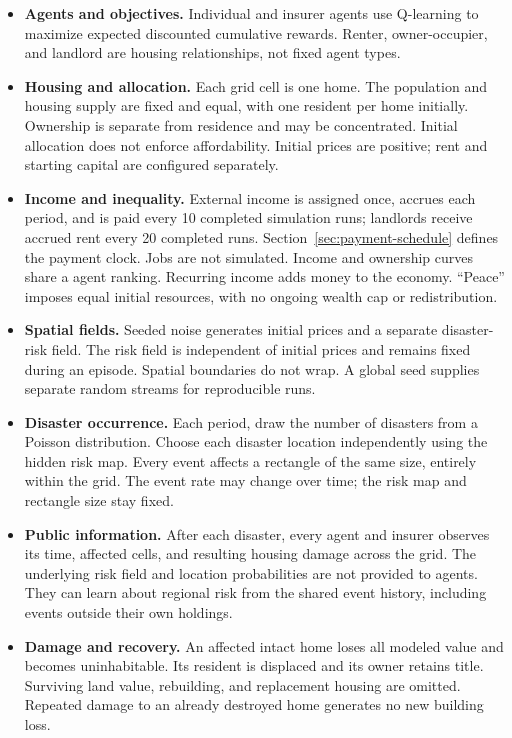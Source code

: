 \documentclass[10pt]{article}
\makeatletter
\renewcommand\section{\@startsection{section}{1}{\z@}{-1.6ex plus -.4ex}{.7ex}{\normalfont\large\bfseries}}
\makeatother
\begin{document}
\section{Model assumptions}
\label{sec:assumptions}

\begin{itemize}
\item \textbf{Agents and objectives.} Individual and insurer agents use Q-learning to maximize expected discounted cumulative rewards. Renter, owner-occupier, and landlord are housing relationships, not fixed agent types.
\item \textbf{Housing and allocation.} Each grid cell is one home. The population and housing supply are fixed and equal, with one resident per home initially. Ownership is separate from residence and may be concentrated. Initial allocation does not enforce affordability. Initial prices are positive; rent and starting capital are configured separately.
\item \textbf{Income and inequality.} External income is assigned once, accrues each period, and is paid every 10 completed simulation runs; landlords receive accrued rent every 20 completed runs. Section~\ref{sec:payment-schedule} defines the payment clock. Jobs are not simulated. Income and ownership curves share a agent ranking. Recurring income adds money to the economy. ``Peace'' imposes equal initial resources, with no ongoing wealth cap or redistribution.
\item \textbf{Spatial fields.} Seeded noise generates initial prices and a separate disaster-risk field. The risk field is independent of initial prices and remains fixed during an episode. Spatial boundaries do not wrap. A global seed supplies separate random streams for reproducible runs.
\item \textbf{Disaster occurrence.} Each period, draw the number of disasters from a Poisson distribution. Choose each disaster location independently using the hidden risk map. Every event affects a rectangle of the same size, entirely within the grid. The event rate may change over time; the risk map and rectangle size stay fixed.
\item \textbf{Public information.} After each disaster, every agent and insurer observes its time, affected cells, and resulting housing damage across the grid. The underlying risk field and location probabilities are not provided to agents. They can learn about regional risk from the shared event history, including events outside their own holdings.
\item \textbf{Damage and recovery.} An affected intact home loses all modeled value and becomes uninhabitable. Its resident is displaced and its owner retains title. Surviving land value, rebuilding, and replacement housing are omitted. Repeated damage to an already destroyed home generates no new building loss.

\end{itemize}
\end{document}
